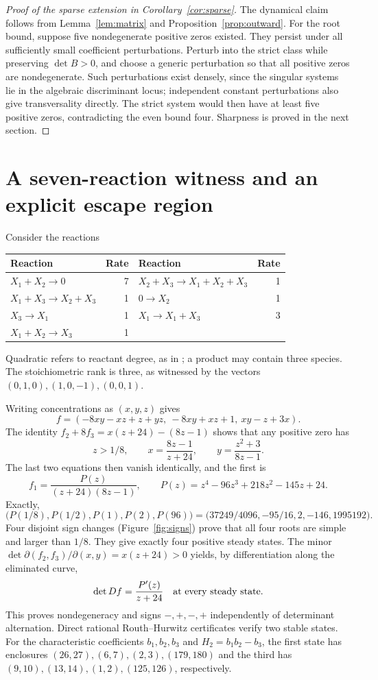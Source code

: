\documentclass[11pt]{article}
\theoremstyle{remark}\newtheorem{remark}[theorem]{Remark}
\begin{document}
\begin{proof}[Proof of the sparse extension in Corollary~\ref{cor:sparse}]
The dynamical claim follows from Lemma~\ref{lem:matrix} and
Proposition~\ref{prop:outward}. For the root bound, suppose five
nondegenerate positive zeros existed. They persist under all sufficiently
small coefficient perturbations. Perturb into the strict class while preserving
$\det B>0$, and choose a generic perturbation so that all positive zeros are
nondegenerate. Such perturbations exist densely, since the singular systems
lie in the algebraic discriminant locus; independent constant perturbations
also give transversality directly. The strict system would then have at least
five positive zeros, contradicting the even bound four. Sharpness is proved
in the next section.
\end{proof}

\section{A seven-reaction witness and an explicit escape region}\label{sec:seven}
Consider the reactions
\begin{center}
\begin{tabular}{lr@{\qquad}lr}
\toprule
Reaction & Rate & Reaction & Rate\\\midrule
$X_1+X_2\to0$ & 7 & $X_2+X_3\to X_1+X_2+X_3$ & 1\\
$X_1+X_3\to X_2+X_3$ & 1 & $0\to X_2$ & 1\\
$X_3\to X_1$ & 1 & $X_1\to X_1+X_3$ & 3\\
$X_1+X_2\to X_3$ & 1 & &\\\bottomrule
\end{tabular}
\end{center}
Quadratic refers to reactant degree, as in \cite{TZ}; a product may contain
three species. The stoichiometric rank is three, as witnessed by the vectors
$(0,1,0),(1,0,-1),(0,0,1)$.

Writing concentrations as $(x,y,z)$ gives
\begin{equation}\label{eq:seven}
 f=(-8xy-xz+z+yz,\ -8xy+xz+1,\ xy-z+3x).
\end{equation}
The identity $f_2+8f_3=x(z+24)-(8z-1)$ shows that any positive zero has
\[
 z>1/8,\qquad x=\frac{8z-1}{z+24},\qquad
 y=\frac{z^2+3}{8z-1}.
\]
The last two equations then vanish identically, and the first is
\[
 f_1=\frac{P(z)}{(z+24)(8z-1)},\qquad
 P(z)=z^4-96z^3+218z^2-145z+24.
\]
Exactly,
\[
 \big(P(1/8),P(1/2),P(1),P(2),P(96)\big)
 =\big(37249/4096,-95/16,2,-146,1995192\big).
\]
Four disjoint sign changes (Figure~\ref{fig:signs}) prove that all four roots
are simple and larger than $1/8$. They give exactly four positive steady states.
The minor $\det\partial(f_2,f_3)/\partial(x,y)=x(z+24)>0$ yields, by
differentiation along the eliminated curve,
\[
 \det Df=\frac{P'(z)}{z+24}\quad\hbox{at every steady state}.
\]
This proves nondegeneracy and signs $-,+,-,+$ independently of determinant
alternation. Direct rational Routh--Hurwitz certificates verify two stable
states. For the characteristic coefficients $b_1,b_2,b_3$ and
$H_2=b_1b_2-b_3$, the first state has enclosures
$(26,27),(6,7),(2,3),(179,180)$ and the third has
$(9,10),(13,14),(1,2),(125,126)$, respectively.
\end{document}
